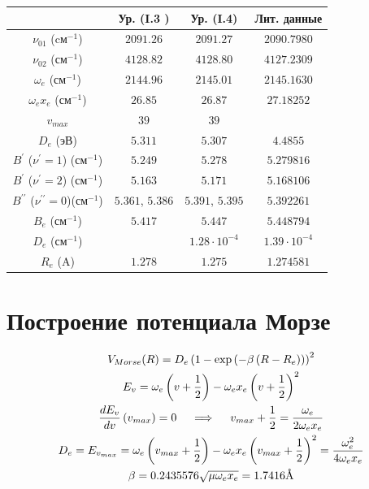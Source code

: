 \documentclass[13pt]{extarticle}
\newcommand{\lb}{\left(}
\newcommand{\rb}{\right)}
\newcommand{\dprime}{{\prime\prime}}
\begin{document}
\begin{table}[!ht]
	\centering
	\begin{tabular}{|c|c|c|c|}
		\hline
		& Ур. (I.3 ) & Ур. (I.4) & Лит. данные \\
		\hline
		$\nu_{01}$ (cм$^{-1}$) & $2091.26$ & $2091.27$ & $2090.7980$ \\
		$\nu_{02}$ (см$^{-1}$) & $4128.82$ & $4128.80$ & $4127.2309$ \\
		$\omega_e$ (см$^{-1}$) & $2144.96$ & $2145.01$ & $2145.1630$ \\ 
		$\omega_e x_e$ (см$^{-1}$) & $26.85$ & $26.87$ & $27.18252$ \\
		$v_{max}$ & $39$ & $39$ & \\
		$D_e$ (эВ) & $5.311$ & $5.307$ & $4.4855$ \\
		$B^\prime$ ($\nu^\prime = 1$) (см$^{-1}$) & $5.249$ & $5.278$ & $5.279816$ \\
		$B^\prime$ ($\nu^\prime = 2$) (см$^{-1}$) & $5.163$ & $5.171$ & $5.168106$ \\
		$B^\dprime$ ($\nu^\dprime = 0$)(см$^{-1}$) & $5.361$, $5.386$ & $5.391$, $5.395$ & $5.392261$ \\
		$B_e$ (см$^{-1}$) & $5.417$ & $5.447$ & $5.448794$ \\
		$D_e$ (см$^{-1}$) & & $1.28 \cdot 10^{-4}$ & $1.39 \cdot 10^{-4}$ \\
		$R_e$ (A) & $1.278$ &  $1.275$ & $1.274581$ \\
		\hline
	\end{tabular}
\end{table}

\section{Построение потенциала Морзе}
\begin{gather}
V_{Morse}(R) = D_e \lb 1 - \exp \lb - \beta \lb R - R_e \rb \rb \rb^2 \notag \\
E_{v} = \omega_e \lb v + \frac{1}{2} \rb - \omega_e x_e \lb v + \frac{1}{2} \rb^2 \notag \\
\frac{d E_{v}}{d v} \lb v_{max} \rb = 0 \quad \implies \quad v_{max} + \frac{1}{2}  = \frac{\omega_e}{2 \omega_e x_e} \notag \\
D_e = E_{v_{max}} = \omega_e \lb v_{max} + \frac{1}{2} \rb - \omega_e x_e \lb v_{max} + \frac{1}{2} \rb^2 = \frac{\omega_e^2}{4 \omega_e x_e} \notag \\
\beta = 0.2435576 \sqrt{ \mu \omega_e x_e } = 1.7416 \textup{\AA} \notag
\end{gather}
\end{document}
